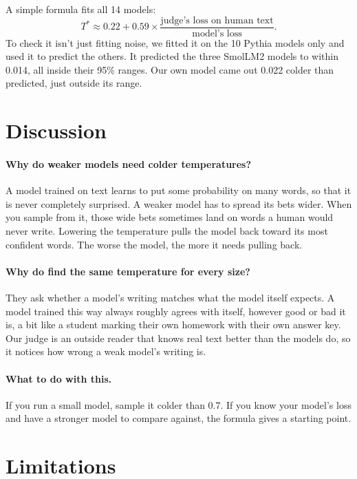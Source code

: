 \documentclass[10pt]{article}
\begin{document}
A simple formula fits all 14 models:
\[
T^* \approx 0.22 + 0.59 \times \frac{\text{judge's loss on human text}}{\text{model's loss}}.
\]
To check it isn't just fitting noise, we fitted it on the 10 Pythia models only and used it to predict the others. It predicted the three SmolLM2 models to within 0.014, all inside their 95\% ranges. Our own model came out 0.022 colder than predicted, just outside its range.

\section{Discussion}

\paragraph{Why do weaker models need colder temperatures?} A model trained on text learns to put some probability on many words, so that it is never completely surprised. A weaker model has to spread its bets wider. When you sample from it, those wide bets sometimes land on words a human would never write. Lowering the temperature pulls the model back toward its most confident words. The worse the model, the more it needs pulling back.

\paragraph{Why do \citet{cao2025entropy} find the same temperature for every size?} They ask whether a model's writing matches what the model itself expects. A model trained this way always roughly agrees with itself, however good or bad it is, a bit like a student marking their own homework with their own answer key. Our judge is an outside reader that knows real text better than the models do, so it notices how wrong a weak model's writing is.

\paragraph{What to do with this.} If you run a small model, sample it colder than 0.7. If you know your model's loss and have a stronger model to compare against, the formula gives a starting point.

\section{Limitations}
\end{document}
